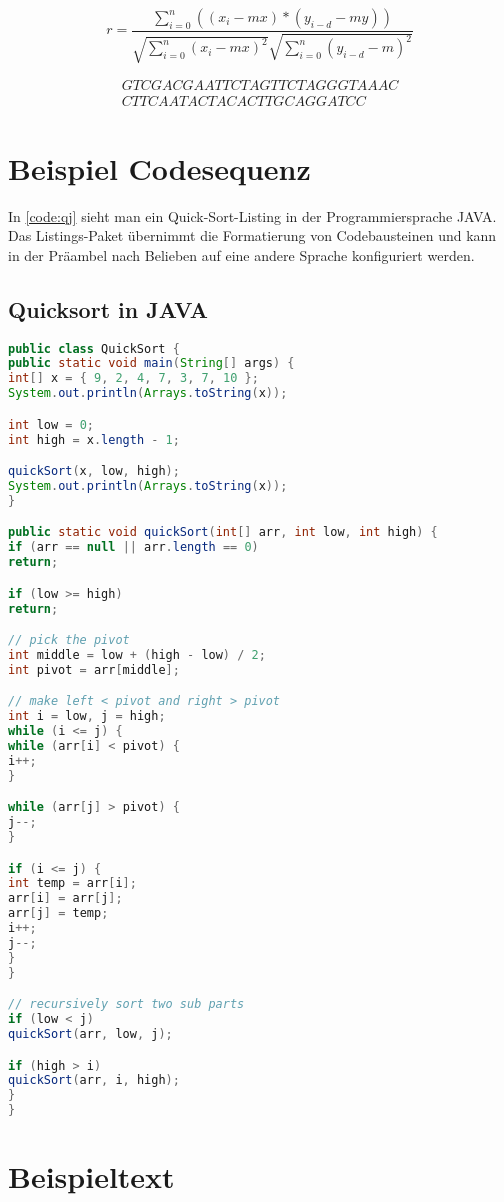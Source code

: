 \begin{equation}
	r = \dfrac{ \displaystyle\sum\limits_{i=0}^n ((x_i-mx)*(y_{i-d}-my)) } { \sqrt{\displaystyle\sum\limits_{i=0}^n(x_i-mx)^2 }\sqrt{ \displaystyle\sum\limits_{i=0}^n(y_{i-d}-m)^2} }
	\label{eq:complex}
\end{equation}

\begin{align}
	\label{eq:line1} GTCGACGAATTCTAGTTCTAGGGTAAAC \\
	\label{eq:line2} CTTCAATACTACACTTGCAGGATCC
\end{align}




\section{Beispiel Codesequenz}
In \cref{code:qj} sieht man ein Quick-Sort-Listing in der Programmiersprache JAVA. Das Listings-Paket übernimmt die Formatierung von Codebausteinen und kann in der Präambel nach Belieben auf eine andere Sprache konfiguriert werden.

\def \currentAuthor {Author2}

\subsection{Quicksort in JAVA}
\begin{lstlisting}[language=Java, caption=QuickSort in Java, label=code:qj]
public class QuickSort {
public static void main(String[] args) {
int[] x = { 9, 2, 4, 7, 3, 7, 10 };
System.out.println(Arrays.toString(x));

int low = 0;
int high = x.length - 1;

quickSort(x, low, high);
System.out.println(Arrays.toString(x));
}

public static void quickSort(int[] arr, int low, int high) {
if (arr == null || arr.length == 0)
return;

if (low >= high)
return;

// pick the pivot
int middle = low + (high - low) / 2;
int pivot = arr[middle];

// make left < pivot and right > pivot
int i = low, j = high;
while (i <= j) {
while (arr[i] < pivot) {
i++;
}

while (arr[j] > pivot) {
j--;
}

if (i <= j) {
int temp = arr[i];
arr[i] = arr[j];
arr[j] = temp;
i++;
j--;
}
}

// recursively sort two sub parts
if (low < j)
quickSort(arr, low, j);

if (high > i)
quickSort(arr, i, high);
}
}
\end{lstlisting}

\section{Beispieltext}

\Blindtext